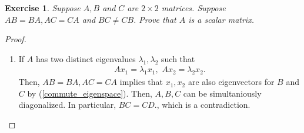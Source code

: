 \documentclass[11pt]{book}
\newtheorem{exercise}{Exercise}[section]
\theoremstyle{definition}
\numberwithin{equation}{chapter}
\begin{document}
\begin{exercise}{\bf *}
Suppose $A, B$ and $C$ are $2 \times 2$ matrices. Suppose $AB = BA, AC = CA$ and $BC \neq CB$. Prove that $A$ is a scalar matrix.
\end{exercise}
\begin{proof}
~\begin{enumerate}[label=(\alph*)]
    \item If $A$ has two distinct eigenvalues $\lambda_1, \lambda_2$ such that
    \begin{align*}
        A x_1 = \lambda_1 x_1, \,\, A x_2 = \lambda_2 x_2.
    \end{align*}
    Then, $AB = BA, AC = CA$ implies that $x_1, x_2$ are also eigenvectors for $B$ and $C$ by (\ref{commute_eigenspace}). Then, $A, B, C$ can be simultaniously diagonalized. In particular, $BC = CD$., which is a contradiction.
    

\end{enumerate}
\end{proof}
\end{document}
